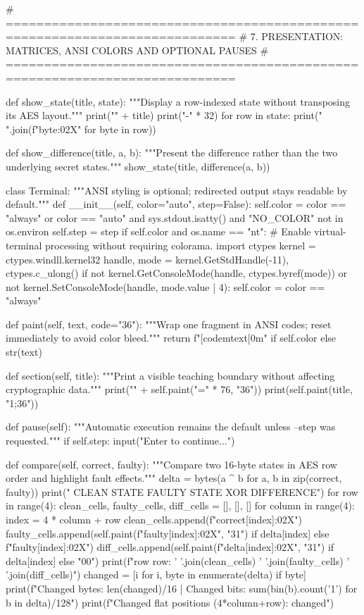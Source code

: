 \begin{lightcode}[numbers=left,firstnumber=1]
# ============================================================================
# 7. PRESENTATION: MATRICES, ANSI COLORS AND OPTIONAL PAUSES
# ============================================================================


def show_state(title, state):
    """Display a row-indexed state without transposing its AES layout."""
    print("\n" + title)
    print("-" * 32)
    for row in state:
        print(" ".join(f"{byte:02X}" for byte in row))


def show_difference(title, a, b):
    """Present the difference rather than the two underlying secret states."""
    show_state(title, difference(a, b))


class Terminal:
    """ANSI styling is optional; redirected output stays readable by default."""
    def __init__(self, color="auto", step=False):
        self.color = color == "always" or color == "auto" and sys.stdout.isatty() and "NO_COLOR" not in os.environ
        self.step = step
        if self.color and os.name == "nt":
            # Enable virtual-terminal processing without requiring colorama.
            import ctypes
            kernel = ctypes.windll.kernel32
            handle, mode = kernel.GetStdHandle(-11), ctypes.c_ulong()
            if not kernel.GetConsoleMode(handle, ctypes.byref(mode)) or not kernel.SetConsoleMode(handle, mode.value | 4):
                self.color = color == "always"

    def paint(self, text, code="36"):
        """Wrap one fragment in ANSI codes; reset immediately to avoid color bleed."""
        return f"[{code}m{text}[0m" if self.color else str(text)

    def section(self, title):
        """Print a visible teaching boundary without affecting cryptographic data."""
        print("\n" + self.paint("=" * 76, "36"))
        print(self.paint(title, "1;36"))

    def pause(self):
        """Automatic execution remains the default unless --step was requested."""
        if self.step:
            input("\nPress Enter to continue...")

    def compare(self, correct, faulty):
        """Compare two 16-byte states in AES row order and highlight fault effects."""
        delta = bytes(a ^ b for a, b in zip(correct, faulty))
        print("          CLEAN STATE         FAULTY STATE        XOR DIFFERENCE")
        for row in range(4):
            clean_cells, faulty_cells, diff_cells = [], [], []
            for column in range(4):
                index = 4 * column + row
                clean_cells.append(f"{correct[index]:02X}")
                faulty_cells.append(self.paint(f"{faulty[index]:02X}", "31") if delta[index] else f"{faulty[index]:02X}")
                diff_cells.append(self.paint(f"{delta[index]:02X}", "31") if delta[index] else "00")
            print(f"row {row}:    {' '.join(clean_cells)}        {' '.join(faulty_cells)}        {' '.join(diff_cells)}")
        changed = [i for i, byte in enumerate(delta) if byte]
        print(f"Changed bytes: {len(changed)}/16 | Changed bits: {sum(bin(b).count('1') for b in delta)}/128")
        print(f"Changed flat positions (4*column+row): {changed}")



\end{lightcode}
